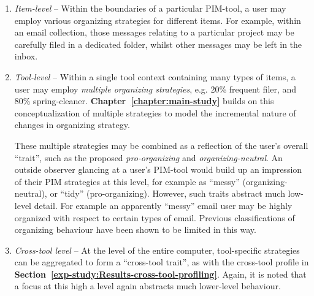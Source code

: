 \begin{enumerate}

\item \textit{Item-level} -- Within the boundaries of a particular PIM-tool, a user may employ various organizing strategies for different items.  For example, within an email collection, those messages relating to a particular project may be carefully filed in a dedicated folder, whilst other messages may be left in the inbox.

\item \textit{Tool-level} -- Within a single tool context containing many types of items, a user may employ \textit{multiple organizing strategies}, e.g. 20\% frequent filer, and 80\% spring-cleaner.  \textbf{Chapter~\ref{chapter:main-study}} builds on this conceptualization of multiple strategies to model the incremental nature of changes in organizing strategy.

These multiple strategies may be combined as a reflection of the user's overall ``trait'', such as the proposed \textit{pro-organizing} and \textit{organizing-neutral}.  An outside observer glancing at a user's PIM-tool would build up an impression of their PIM strategies at this level, for example as ``messy'' (organizing-neutral), or ``tidy'' (pro-organizing).  %
However, such traits abstract much low-level detail.  For example an apparently ``messy'' email user may be highly organized with respect to certain types of email.  Previous classifications of organizing behaviour have been shown to be limited in this way.  %

\item \textit{Cross-tool level} -- At the level of the entire computer, tool-specific strategies can be aggregated to form a ``cross-tool trait'', as with the cross-tool profile in \textbf{Section~\ref{exp-study:Results-cross-tool-profiling}}.  Again, it is noted that a focus at this high a level again abstracts much lower-level behaviour.
\end{enumerate}

